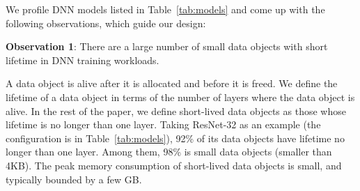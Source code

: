 We profile DNN models listed in Table~\ref{tab:models} \textcolor{dong2}{and come up with the following observations, which guide our design: }

\textbf{Observation 1}: There are a large number of small data objects with short lifetime in DNN training workloads.

\textcolor{check}{
A data object is alive after it is allocated and before it is freed. We define the lifetime of a data object in terms of the number of layers where the data object is alive. In the rest of the paper, we define short-lived data objects as those whose lifetime is no longer than one layer. Taking ResNet-32 as an example (the configuration is in Table~\ref{tab:models}), 92\% of its data objects have lifetime no longer than one layer. Among them, 98\% is small data objects (smaller than 4KB). The peak memory consumption of short-lived data objects is small, and typically bounded by a few GB.}



